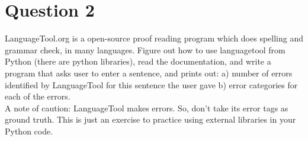 \documentclass[11pt,a4paper]{article}
\begin{document}
\section*{Question 2}
LanguageTool.org is a open-source proof reading program which does spelling and grammar check, in many languages. Figure out how to use languagetool from Python (there are python libraries), read the documentation, and write a program that asks user to enter a sentence, and prints out: a) number of errors identified by LanguageTool for this sentence the user gave b) error categories for each of the errors.
\\ A note of caution: LanguageTool makes errors. So, don't take its error tags as ground truth. This is just an exercise to practice using external libraries in your Python code.
\end{document}
